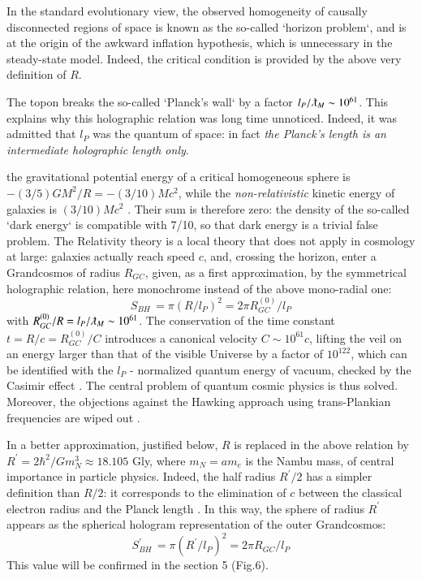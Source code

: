 \documentclass[twoside,draft]{article}
\begin{document}
\begin{sloppypar}
In the standard evolutionary view, the observed homogeneity of causally disconnected regions of space is known as the so-called `horizon problem`, and is at the origin of the awkward inflation hypothesis, which is unnecessary in the steady-state model. Indeed, the critical condition is provided by the above very definition of $R$.

The topon breaks the so-called `Planck's wall` by a factor $l_{P}/\lambdabar_{M}\sim 10^{61}$. This explains why this holographic relation was long time unnoticed. Indeed, it was admitted that $l_{P}$ was the quantum of space: in fact \textit{the Planck's length is an intermediate holographic length only}.

the gravitational potential energy of a critical homogeneous sphere is $-(3/5)GM^{2}/R = -
(3/10)Mc^{2}$, while the \textit{non-relativistic} kinetic energy of galaxies is $(3/10)Mc^{2}$ \cite{Sanchez1}. Their sum is therefore zero: the density of the so-called `dark energy` is compatible with 7/10, so that dark energy is a trivial false problem. 
The Relativity theory is a local theory that does not apply in cosmology at large: 
galaxies actually reach speed $c$, and, crossing the horizon, enter a Grandcosmos of radius $R_{GC}$, given, as a first approximation, by the symmetrical holographic relation, here monochrome instead of the above mono-radial one:
\begin{equation}
S_{BH}\, = \pi(R/l_P )^{2} = 2\pi R^{(0)}_{GC} /l_{P}
\end{equation}
with $R^{(0)}_{GC} /R = l_{P} /\lambdabar_{M} \sim 10^{61}$. 
The conservation of the time constant $t = R/c = R^{(0)}_{GC} /C$ introduces a canonical velocity $C \sim 10^{61} c$, 
lifting the veil on an energy larger than that of the visible Universe by a factor of $10^{122}$, which can be identified with the $l_{P}$ - normalized quantum energy of vacuum, checked by the Casimir effect \cite{Duplantier}. The central problem of quantum cosmic physics is thus solved. Moreover, the objections against the Hawking approach using trans-Plankian frequencies are wiped out \cite{Damour}.

In a better approximation, justified below, $R$ is replaced in the above relation by $R^{\prime} = 2\hbar^{2}/Gm_{N}^{3}
\approx 18.105$ Gly, where $m_{N} = am_{e}$ is the Nambu mass, of central importance in particle physics. Indeed, the half radius $R^{\prime}/2$ has a simpler definition than $R/2$: it corresponds to the elimination of $c$ between the classical electron radius and the Planck length \cite{Sanchez1}. In this way, the sphere of radius $R^{\prime}$ appears 
as the spherical hologram representation of the outer Grandcosmos:
\begin{equation}
S^{\prime}_{BH}\, = \pi(R^{\prime}/l_{P})^{2} = 2\pi R_{GC} /l_{P}
\end{equation}
This value will be confirmed in the section 5 (Fig.6).


\end{sloppypar}
\end{document}
